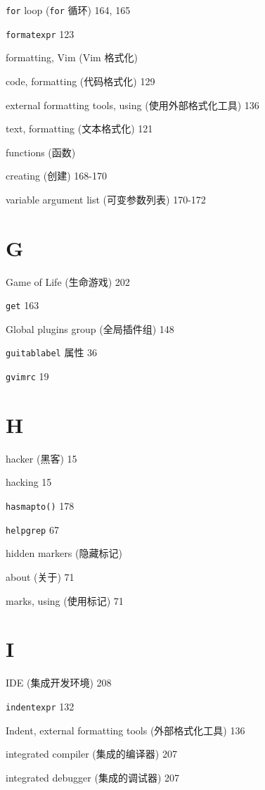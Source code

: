 \begin{multicols}{2}
\texttt{for} loop (\texttt{for} 循环) 164, 165

\texttt{formatexpr} 123

formatting, Vim (Vim 格式化) \par
  code, formatting (代码格式化) 129 \par
  external formatting tools, using (使用外部格式化工具) 136 \par
  text, formatting (文本格式化) 121 \par

functions (函数) \par
  creating (创建) 168-170 \par
  variable argument list (可变参数列表) 170-172 \par

\section*{G}

Game of Life (生命游戏) 202

\texttt{get} 163

Global plugins group (全局插件组) 148

\texttt{guitablabel} 属性 36

\texttt{gvimrc} 19

\section*{H}

hacker (黑客) 15

hacking 15

\texttt{hasmapto()} 178

\texttt{helpgrep} 67

hidden markers (隐藏标记) \par
  about (关于) 71 \par
  marks, using (使用标记) 71 \par

\section*{I}

IDE (集成开发环境) 208

\texttt{indentexpr} 132

Indent, external formatting tools (外部格式化工具) 136

integrated compiler (集成的编译器) 207

integrated debugger (集成的调试器) 207


\end{multicols}
